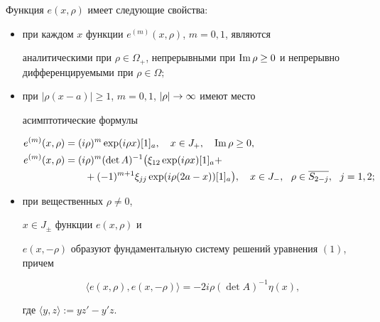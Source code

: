 \begin{lem}


Функция $e(x,\rho)$ имеет следующие свойства\/${:}$


\begin{itemize}


\item[(i${}_1$)] при каждом $x$ функции $e^{(m)}(x,\rho)$, $m=0,1$, являются


аналитическими при $\rho\in\Omega_{+}$, непрерывными при $\im


\rho\ge 0$ и непрерывно дифференцируемыми при $\rho\in\Omega;$


\item[(i${}_2$)] при $|\rho(x-a)|\ge 1$, $m=0,1$, $|\rho|\to\infty$ имеют место


асимптотические формулы


\begin{align}


e^{(m)}(x,\rho)&=(i\rho)^m \exp(i\rho x)[1]_a,


\quad x\in J_{+},\quad  \im\rho\ge 0,\\


%


e^{(m)}(x,\rho)&=(i\rho)^m (\det A)^{-1}\big(\xi_{12}


\exp(i\rho x)[1]_a +\notag \\


%


&\qquad+(-1)^{m+1}\xi_{jj}\exp(i\rho(2a-x))[1]_a\big),


\quad x\in J_{-},\ \ \rho\in\overline{S_{2-j}},\ \ j=1,2;


\end{align}


\item[(i${}_3$)] при вещественных $\rho\ne 0$,


$x\in J_{\pm}$ функции $e(x,\rho)$ и


$e(x,-\rho)$ образуют фундаментальную систему решений уравнения $(1)$, причем


$$


\langle e(x,\rho), e(x,-\rho)\rangle=-2i\rho (\det A)^{-1}\eta(x),


$$


где $\langle y,z\rangle :=yz'-y'z$.


\end{itemize}


\end{lem}





